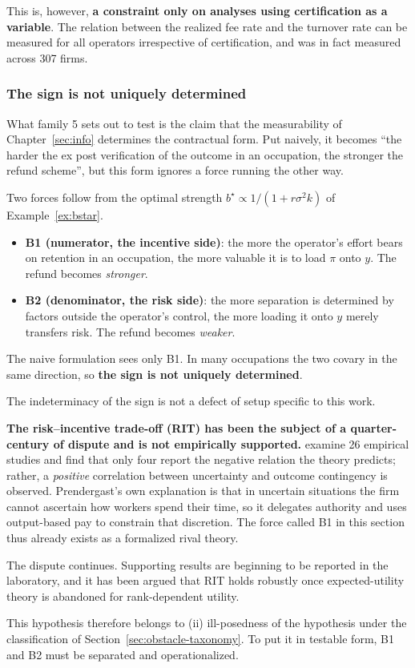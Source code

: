This is, however, \textbf{a constraint only on analyses using certification as a variable}. The
relation between the realized fee rate and the turnover rate can be measured for all operators
irrespective of certification, and was in fact measured across 307 firms.

\subsubsection{The sign is not uniquely determined}
\label{sec:predB-illposed}

What family 5 sets out to test is the claim that the measurability of Chapter~\ref{sec:info}
determines the contractual form. Put naively, it becomes ``the harder the ex post verification of
the outcome in an occupation, the stronger the refund scheme'', but this form ignores a force
running the other way.

Two forces follow from the optimal strength $b^\star \propto 1/(1+r\sigma^2 k)$ of
Example~\ref{ex:bstar}.

\begin{itemize}
\item \textbf{B1 (numerator, the incentive side)}: the more the operator's effort bears on
retention in an occupation, the more valuable it is to load $\pi$ onto $y$. The refund becomes
\emph{stronger}.
\item \textbf{B2 (denominator, the risk side)}: the more separation is determined by factors
outside the operator's control, the more loading it onto $y$ merely transfers risk. The refund
becomes \emph{weaker}.
\end{itemize}

The naive formulation sees only B1. In many occupations the two covary in the same direction, so
\textbf{the sign is not uniquely determined}.

\begin{remark}
The indeterminacy of the sign is not a defect of setup specific to this work.

\textbf{The risk--incentive trade-off (RIT) has been the subject of a quarter-century of dispute
and is not empirically supported.} \cite{prendergast1999,prendergast2002} examine 26 empirical
studies and find that only four report the negative relation the theory predicts; rather, a
\emph{positive} correlation between uncertainty and outcome contingency is observed. Prendergast's
own explanation is that in uncertain situations the firm cannot ascertain how workers spend their
time, so it delegates authority and uses output-based pay to constrain that discretion. The force
called B1 in this section thus already exists as a formalized rival theory.

The dispute continues. Supporting results are beginning to be reported in the laboratory, and it
has been argued that RIT holds robustly once expected-utility theory is abandoned for
rank-dependent utility.

This hypothesis therefore belongs to (ii) ill-posedness of the hypothesis under the
classification of Section~\ref{sec:obstacle-taxonomy}. To put it in testable form, B1 and B2 must
be separated and operationalized.
\end{remark}

